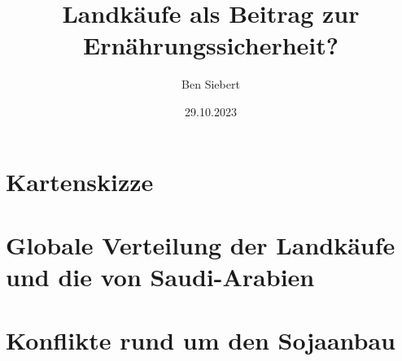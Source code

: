 \documentclass[11pt]{article}
\begin{document}
    \selectfont

    \renewcommand{\baselinestretch}{1.50}\normalsize

    \title{Landkäufe als Beitrag zur Ernährungssicherheit?}
    \author{Ben Siebert}
    \date{29.10.2023}
    \maketitle

    \section{Kartenskizze}

    

    \section{Globale Verteilung der Landk\"aufe und die von Saudi-Arabien}

    

    \section{Konflikte rund um den Sojaanbau}

    
\end{document}

